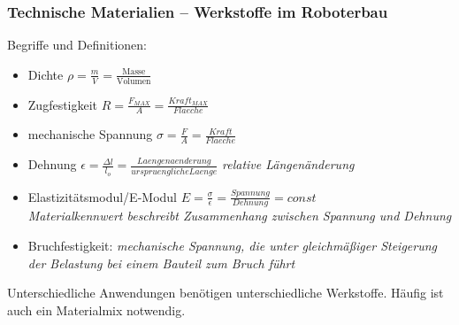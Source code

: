 \subsubsection{Technische Materialien -- Werkstoffe im Roboterbau}
Begriffe und Definitionen:
\begin{itemize}
	\item Dichte $\rho = \frac{m}{V} = \frac{\text{Masse}}{\text{Volumen}}$
	\item Zugfestigkeit $R = \frac{F_{MAX}}{A} = \frac{Kraft_{MAX}}{Flaeche}$
	\item mechanische Spannung $\sigma = \frac{F}{A} = \frac{Kraft}{Flaeche}$
	\item Dehnung $\epsilon = \frac{\Delta l}{l_o} = \frac{Laengenaenderung}{urspruengliche Laenge}$
	\textit{relative Längenänderung}
	\item Elastizitätsmodul/E-Modul $E = \frac{\sigma}{\epsilon} = \frac{Spannung}{Dehnung} = const$\\
	\textit{Materialkennwert beschreibt Zusammenhang zwischen Spannung und Dehnung}
	\item Bruchfestigkeit: \textit{mechanische Spannung, die unter gleichmäßiger Steigerung der Belastung bei einem Bauteil zum Bruch führt}
\end{itemize}
Unterschiedliche Anwendungen benötigen unterschiedliche Werkstoffe. Häufig ist auch ein Materialmix notwendig.

